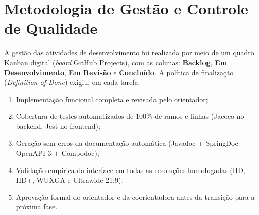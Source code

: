 \begin{figure}[htb]
{
}%
\end{figure}

\section{Metodologia de Gestão e Controle de Qualidade}
\label{sec_gestao_qualidade}

A gestão das atividades de desenvolvimento foi realizada por meio de um
quadro Kanban digital (\textit{board} GitHub Projects), com as colunas:
\textbf{Backlog}, \textbf{Em Desenvolvimento}, \textbf{Em Revisão} e
\textbf{Concluído}. A política de finalização (\textit{Definition of Done})
exigiu, em cada tarefa:

\begin{enumerate}
    \item Implementação funcional completa e revisada pelo orientador;
    \item Cobertura de testes automatizados de 100\% de ramos e linhas
    (Jacoco no backend, Jest no frontend);
    \item Geração sem erros da documentação automática
    (Javadoc + SpringDoc OpenAPI 3 + Compodoc);
    \item Validação empírica da interface em todas as resoluções homologadas
    (HD, HD+, WUXGA e Ultrawide 21:9);
    \item Aprovação formal do orientador e da coorientadora antes da
    transição para a próxima fase.
\end{enumerate}

